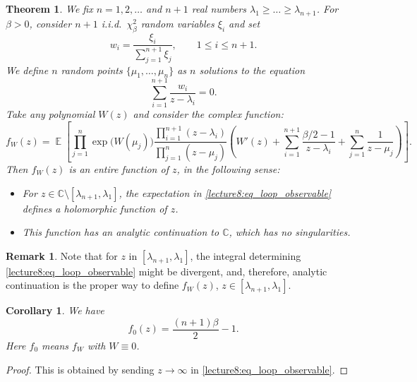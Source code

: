 \documentclass[letterpaper,11pt,oneside,reqno]{book}
\numberwithin{equation}{chapter}  %
\newtheorem{corollary}[proposition]{Corollary}
\newtheorem{theorem}[proposition]{Theorem}
\theoremstyle{definition}
\newtheorem{remark}[proposition]{Remark}
\begin{document}
\begin{theorem}
	\label{lecture8:Theorem_loop_equation}
 We fix $n=1,2,\dots$ and $n+1$ real numbers $\lambda_1\ge\dots\ge\lambda_{n+1}$. For $\beta>0$, consider $n+1$ i.i.d.\ $\chi^2_\beta$ random variables $\xi_i$ and set
 $$
  w_i=\frac{\xi_i}{\sum_{j=1}^{n+1} \xi_j}, \qquad 1\le i \le n+1.
 $$
 We define $n$ random points $\{\mu_1,\dots,\mu_n\}$ as $n$ solutions to the equation
 \begin{equation} \label{lecture8:eq_mu_equation}
  \sum_{i=1}^{n+1} \frac{w_i}{z-\lambda_i}=0.
 \end{equation}
 Take any \emph{polynomial} $W(z)$ and consider the complex function:
 \begin{equation}
 \label{lecture8:eq_loop_observable}
 f_W(z)=\operatorname{\mathbb{E}}\left[\prod_{j=1}^n \exp\bigl(W(\mu_j)\bigr) \frac{\prod_{i=1}^{n+1} (z-\lambda_i)}{\prod_{j=1}^n (z-\mu_j)} \left( W'(z)+\sum_{i=1}^{n+1} \frac{\beta/2-1}{z-\lambda_i} + \sum_{j=1}^n \frac{1}{z-\mu_j}\right)\right].
 \end{equation}
 Then $f_W(z)$ is an \emph{entire function} of $z$, in the following sense:
 \begin{itemize}
	 \item For $z\in \mathbb{C}\setminus [\lambda_{n+1},\lambda_1]$, the expectation in \eqref{lecture8:eq_loop_observable} defines a holomorphic function of $z$.
  \item This function has an analytic continuation to $\mathbb{C}$, which has no singularities.
 \end{itemize}
\end{theorem}
\begin{remark}
 Note that for $z$ in
 $[\lambda_{n+1},\lambda_1]$, the integral determining
 \eqref{lecture8:eq_loop_observable} might be divergent, and,
 therefore, analytic continuation is the proper way to
 define $f_W(z)$, $z\in [\lambda_{n+1},\lambda_1]$.
\end{remark}

\begin{corollary}
	We have
\begin{equation*}
	f_0(z)=\frac{(n+1)\beta}{2}-1.
\end{equation*}
Here $f_0$ means $f_W$ with $W\equiv 0$.
\end{corollary}
\begin{proof}
This is obtained by sending $z\to \infty$ in
	\eqref{lecture8:eq_loop_observable}.
\end{proof}
\end{document}
